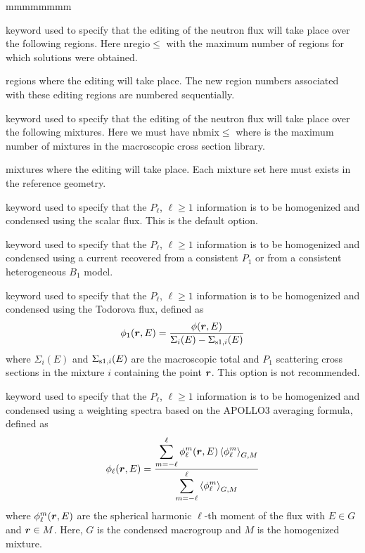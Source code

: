 \begin{ListeDeDescription}{mmmmmmmm}
\item[\moc{REGI}] keyword used to specify that the editing of the neutron flux will
take place over the following regions. Here nregio$\le$
with  the maximum number of regions for which solutions were
obtained.

\item[\dusa{iregt}] regions where the editing will take place. The new region
numbers associated with these editing regions are numbered sequentially.

\item[\moc{MIX}] keyword used to specify that the editing of the neutron
flux will take place over the following mixtures. Here
we must have nbmix$\le$ where  is the maximum number
of mixtures in the macroscopic cross section library.  

\item[\dusa{imixt}] mixtures where the editing will take place.
Each mixture set here must exists in the reference geometry.

\item[\moc{P0W}] keyword used to specify that the $P_\ell$, $\ell\ge 1$ information is to be
homogenized and condensed using the scalar flux. This is the default option.

\item[\moc{P1W\_L}] keyword used to specify that the $P_\ell$, $\ell\ge 1$ information is to be
homogenized and condensed using a current recovered from a consistent $P_1$ or
from a consistent heterogeneous $B_1$ model.

\item[\moc{P1W\_TO}] keyword used to specify that the $P_\ell$, $\ell\ge 1$ information is to be
homogenized and condensed using the Todorova flux\cite{todorova}, defined as
$$
\phi_1(\bff(r),E)={\phi(\bff(r),E)\over \Sigma_i(E)-\Sigma_{{\rm s1},i}(E)}
$$
\noindent where $\Sigma_i(E)$ and $\Sigma_{{\rm s1},i}(E)$ are the macroscopic total and $P_1$ scattering
cross sections in the mixture $i$ containing the point $\bff(r)$. This option is not recommended.

\item[\moc{PNW\_SP}] keyword used to specify that the $P_\ell$, $\ell\ge 1$ information is to be
homogenized and condensed using a weighting spectra based on the APOLLO3 averaging formula\cite{condPn}, defined as
$$
\phi_\ell(\bff(r),E)={ \displaystyle\sum_{m=-\ell}^\ell \phi_\ell^m(\bff(r),E) \left<\phi_\ell^m\right>_{G,M} \over \displaystyle\sum_{m=-\ell}^\ell \left<\phi_\ell^m\right>_{G,M} }
$$
where $\phi_\ell^m(\bff(r),E)$ are the spherical harmonic $\ell$-th moment of the flux with $E \in G$ and $\bff(r) \in M$. Here, $G$ is the
condensed macrogroup and $M$ is the homogenized mixture.


\end{ListeDeDescription}
